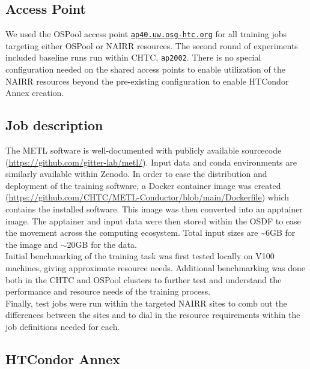 \documentclass{article}
\begin{document}

\subsection{Access Point}\label{access-point}

We used the OSPool access point
\href{http://ap40.uw.osg-htc.org}{\texttt{ap40.uw.osg-htc.org}} for all
training jobs targeting either OSPool or NAIRR resources. The second round of
experiments included baseline runs run within CHTC, \texttt{ap2002}.
There is no special configuration needed on the shared access points to
enable utilization of the NAIRR resources beyond the pre-existing
configuration to enable HTCondor Annex creation.

\subsection{Job description}\label{job-description}

The METL software is well-documented with publicly available sourcecode
(\url{https://github.com/gitter-lab/metl/}). Input data and conda environments
are similarly available within Zenodo\cite{gelman_2025_14916528}. In order to
ease the distribution and deployment of the training software, a Docker
container image was created
(\url{https://github.com/CHTC/METL-Conductor/blob/main/Dockerfile}) which
contains the installed software. This image was then converted into an
apptainer\cite{apptainer} image. The apptainer and input data were then stored
within the OSDF to ease the movement across the computing ecosystem. Total input
sizes are \textasciitilde6GB for the image and $\sim$20GB for the data.\\
Initial benchmarking of the training task was first tested locally on V100
machines, giving approximate resource needs. Additional benchmarking was done
both in the CHTC and OSPool clusters to further test and understand the
performance and resource needs of the training process.\\ Finally, test jobs
were run within the targeted NAIRR sites to comb out the differences between the
sites and to dial in the resource requirements within the job definitions needed
for each.

\subsection{HTCondor Annex}\label{htcondor-annex}
\end{document}
